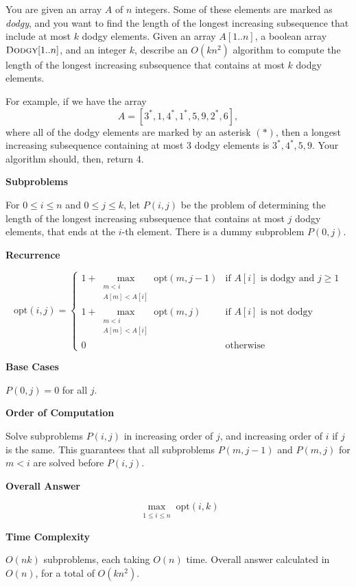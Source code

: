 \documentclass{article}
\begin{document}
\begin{question}
You are given an array $A$ of $n$ integers. Some of these elements are marked as {\em dodgy}, and you want to find the length of the longest increasing subsequence that include at most $k$ dodgy elements. Given an array $A[1..n]$, a boolean array $\mathsf{\textsc{Dodgy}}[1..n]$, and an integer $k$, describe an $O(kn^2)$ algorithm to compute the length of the longest increasing subsequence that contains at most $k$ dodgy elements.

For example, if we have the array \[A = [3^*, 1, 4^*, 1^*, 5, 9, 2^*, 6],\] where all of the dodgy elements are marked by an asterisk $(*)$, then a longest increasing subsequence containing at most 3 dodgy elements is $3^*, 4^*, 5, 9$. Your algorithm should, then, return 4.
\end{question}

\begin{solution}

\textbf{Subproblems}

For $0\leq i \leq n$ and $0\leq j \leq k$, let $P(i,j)$ be the problem of determining
the length of the longest increasing subsequence that contains at most $j$ dodgy elements,
that ends at the $i$-th element. There is a dummy subproblem $P(0, j)$.

\textbf{Recurrence}

$$\mathrm{opt}(i,j) = \begin{cases}
    \displaystyle 1+\max_{\substack{m < i\\A[m] < A[i]}}\mathrm{opt}(m, j-1) & \text{if }A[i]\text{ is dodgy and }j \geq 1\\
    \displaystyle 1+\max_{\substack{m < i\\A[m] < A[i]}}\mathrm{opt}(m, j) & \text{if }A[i]\text{ is not dodgy}\\
    0 &\text{otherwise}
\end{cases}    $$

\textbf{Base Cases}

$P(0, j) = 0$ for all $j$.

\textbf{Order of Computation}

Solve subproblems $P(i, j)$ in increasing order of $j$, and increasing order of $i$ if $j$ is the same.
This guarantees that all subproblems $P(m, j-1)$ and $P(m, j)$ for $m < i$ are solved before $P(i,j)$.

\textbf{Overall Answer}

$$\max_{\substack{1\leq i \leq n}} \mathrm{opt}(i, k)$$

\textbf{Time Complexity}

$O(nk)$ subproblems, each taking $O(n)$ time. Overall answer calculated in $O(n)$, for a total of $O(kn^2)$.

\end{solution}
\end{document}
